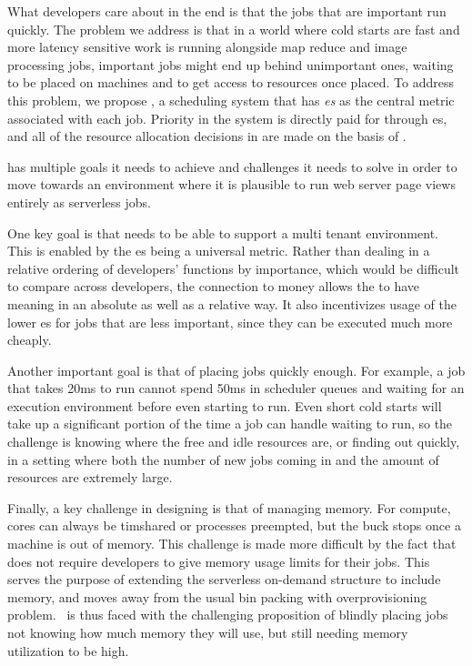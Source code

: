 What developers care about in the end is that the jobs that are important run
quickly. The problem we address is that in a world where cold starts are fast
and more latency sensitive work is running alongside map reduce and image
processing jobs, important jobs might end up behind unimportant ones, waiting to
be placed on machines and to get access to resources once placed. To address
this problem, we propose \sys{}, a scheduling system that has
\textit{\priceclass{}es} as the central metric associated with each job.
Priority in the system is directly paid for through \priceclass{}es, and all of
the resource allocation decisions in \sys{} are made on the basis of
\priceclass{}.

\Sys{} has multiple goals it needs to achieve and challenges it needs to solve
in order to move towards an environment where it is plausible to run web server
page views entirely as serverless jobs.

One key goal is that \sys{} needs to be able to support a multi tenant
environment. This is enabled by the \priceclass{}es being a universal metric.
Rather than dealing in a relative ordering of developers' functions by
importance, which would be difficult to compare across developers, the
connection to money allows the \class{} to have meaning in an absolute as well
as a relative way. It also incentivizes usage of the lower \class{}es for jobs
that are less important, since they can be executed much more cheaply.


Another important goal is that of placing jobs quickly enough. For example, a
job that takes 20ms to run cannot spend 50ms in scheduler queues and waiting for
an execution environment before even starting to run. Even short cold starts
will take up a significant portion of the time a job can handle waiting to run,
so the challenge is knowing where the free and idle resources are, or finding
out quickly, in a setting where both the number of new jobs coming in and the
amount of resources are extremely large.


Finally, a key challenge in designing \sys{} is that of managing memory. For
compute, cores can always be timshared or processes preempted, but the buck
stops once a machine is out of memory. This challenge is made more difficult by
the fact that \sys{} does not require developers to give memory usage limits for
their jobs. This serves the purpose of extending the serverless on-demand
structure to include memory, and moves away from the usual bin packing with
overprovisioning problem.~\Sys{} is thus faced with the challenging proposition
of blindly placing jobs not knowing how much memory they will use, but still
needing memory utilization to be high.



 
